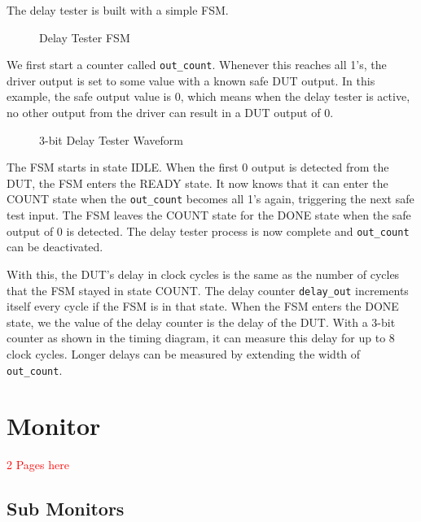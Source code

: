 The delay tester is built with a simple FSM.

\begin{figure}[H]
  \centering
  
  \caption{Delay Tester FSM}
  \label{DelayTesterFSM}
\end{figure}

We first start a counter called \texttt{out\_count}.
Whenever this reaches all 1's, the driver output is set to some value with a known safe DUT output.
In this example, the safe output value is 0, which means when the delay tester is active, no other output from the driver can result in a DUT output of 0.

\begin{figure}[H]
  \centering
  
  \caption{3-bit Delay Tester Waveform}
  \label{DelayTesterWF}
\end{figure}

The FSM starts in state IDLE.
When the first 0 output is detected from the DUT, the FSM enters the READY state.
It now knows that it can enter the COUNT state when the \texttt{out\_count} becomes all 1's again, triggering the next safe test input.
The FSM leaves the COUNT state for the DONE state when the safe output of 0 is detected.
The delay tester process is now complete and \texttt{out\_count} can be deactivated.

With this, the DUT's delay in clock cycles is the same as the number of cycles that the FSM stayed in state COUNT.
The delay counter \texttt{delay\_out} increments itself every cycle if the FSM is in that state.
When the FSM enters the DONE state, we the value of the delay counter is the delay of the DUT.
With a 3-bit counter as shown in the timing diagram, it can measure this delay for up to 8 clock cycles.
Longer delays can be measured by extending the width of \texttt{out\_count}.

\section{Monitor}

\textcolor{red}{2 Pages here}

\subsection{Sub Monitors}


